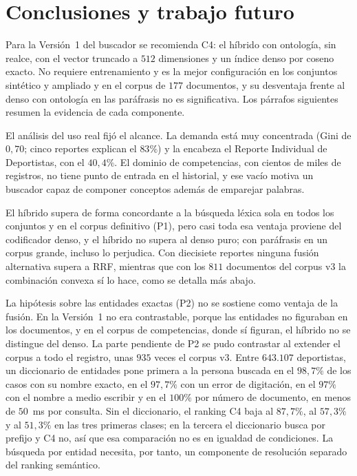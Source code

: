 \documentclass[11pt,letterpaper]{article}
\numberwithin{equation}{section}
\begin{document}
\section{Conclusiones y trabajo futuro}
\label{sec:conclusiones}
Para la Versión~1 del buscador se recomienda C4: el híbrido con ontología, sin realce, con el vector truncado a $512$ dimensiones y un índice denso por coseno exacto. No requiere entrenamiento y es la mejor configuración en los conjuntos sintético y ampliado y en el corpus de $177$ documentos, y su desventaja frente al denso con ontología en las paráfrasis no es significativa. Los párrafos siguientes resumen la evidencia de cada componente.

El análisis del uso real fijó el alcance. La demanda está muy concentrada (Gini de $0{,}70$; cinco reportes explican el $83\%$) y la encabeza el Reporte Individual de Deportistas, con el $40{,}4\%$. El dominio de competencias, con cientos de miles de registros, no tiene punto de entrada en el historial, y ese vacío motiva un buscador capaz de componer conceptos además de emparejar palabras.

El híbrido supera de forma concordante a la búsqueda léxica sola en todos los conjuntos y en el corpus definitivo (P1), pero casi toda esa ventaja proviene del codificador denso, y el híbrido no supera al denso puro; con paráfrasis en un corpus grande, incluso lo perjudica. Con diecisiete reportes ninguna fusión alternativa supera a RRF, mientras que con los $811$ documentos del corpus v3 la combinación convexa sí lo hace, como se detalla más abajo.

La hipótesis sobre las entidades exactas (P2) no se sostiene como ventaja de la fusión. En la Versión~1 no era contrastable, porque las entidades no figuraban en los documentos, y en el corpus de competencias, donde sí figuran, el híbrido no se distingue del denso. La parte pendiente de P2 se pudo contrastar al extender el corpus a todo el registro, unas $935$ veces el corpus v3. Entre $643.107$ deportistas, un diccionario de entidades pone primera a la persona buscada en el $98{,}7\%$ de los casos con su nombre exacto, en el $97{,}7\%$ con un error de digitación, en el $97\%$ con el nombre a medio escribir y en el $100\%$ por número de documento, en menos de $50$~ms por consulta. Sin el diccionario, el ranking C4 baja al $87{,}7\%$, al $57{,}3\%$ y al $51{,}3\%$ en las tres primeras clases; en la tercera el diccionario busca por prefijo y C4 no, así que esa comparación no es en igualdad de condiciones. La búsqueda por entidad necesita, por tanto, un componente de resolución separado del ranking semántico.
\end{document}
